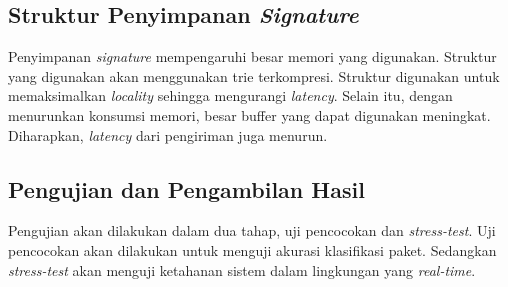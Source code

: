     \subsection{Struktur Penyimpanan \emph{Signature}}

      Penyimpanan \emph{signature} mempengaruhi besar memori yang digunakan. Struktur yang digunakan akan menggunakan trie terkompresi. Struktur digunakan untuk memaksimalkan \emph{locality} sehingga mengurangi \emph{latency}. Selain itu, dengan menurunkan konsumsi memori, besar buffer yang dapat digunakan meningkat. Diharapkan, \emph{latency} dari pengiriman juga menurun.

    \subsection{Pengujian dan Pengambilan Hasil}

      Pengujian akan dilakukan dalam dua tahap, uji pencocokan dan \emph{stress-test}. Uji pencocokan akan dilakukan untuk menguji akurasi klasifikasi paket. Sedangkan \emph{stress-test} akan menguji ketahanan sistem dalam lingkungan yang \emph{real-time}.